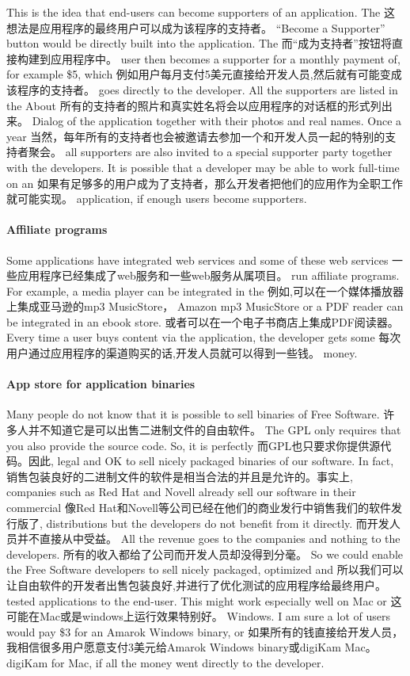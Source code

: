 This is the idea that end-users can become supporters of an application. The
这想法是应用程序的最终用户可以成为该程序的支持者。
``Become a Supporter'' button would be directly built into the application. The
而“成为支持者”按钮将直接构建到应用程序中。
user then becomes a supporter for a monthly payment of, for example \$5, which
例如用户每月支付5美元直接给开发人员,然后就有可能变成该程序的支持者。
goes directly to the developer. All the supporters are listed in the About
所有的支持者的照片和真实姓名将会以应用程序的对话框的形式列出来。
Dialog of the application together with their photos and real names. Once a year
当然，每年所有的支持者也会被邀请去参加一个和开发人员一起的特别的支持者聚会。
all supporters are also invited to a special supporter party together with the
developers. It is possible that a developer may be able to work full-time on an
如果有足够多的用户成为了支持者，那么开发者把他们的应用作为全职工作就可能实现。
application, if enough users become supporters.

\paragraph*{Affiliate programs}

Some applications have integrated web services and some of these web services
一些应用程序已经集成了web服务和一些web服务从属项目。
run affiliate programs. For example, a media player can be integrated in the
例如,可以在一个媒体播放器上集成亚马逊的mp3 MusicStore，
Amazon mp3 MusicStore or a PDF reader can be integrated in an ebook store.
或者可以在一个电子书商店上集成PDF阅读器。
Every time a user buys content via the application, the developer gets some
每次用户通过应用程序的渠道购买的话,开发人员就可以得到一些钱。
money.

\paragraph*{App store for application binaries}

Many people do not know that it is possible to sell binaries of Free Software.
许多人并不知道它是可以出售二进制文件的自由软件。
The GPL only requires that you also provide the source code. So, it is perfectly
而GPL也只要求你提供源代码。因此,
legal and OK to sell nicely packaged binaries of our software. In fact,
销售包装良好的二进制文件的软件是相当合法的并且是允许的。事实上,
companies such as Red Hat and Novell already sell our software in their commercial 
像Red Hat和Novell等公司已经在他们的商业发行中销售我们的软件发行版了,
distributions but the developers do not benefit from it directly. 
而开发人员并不直接从中受益。
All the revenue goes to the companies and nothing to the developers. 
所有的收入都给了公司而开发人员却没得到分毫。
So we could enable the Free Software developers to sell nicely packaged, optimized and
所以我们可以让自由软件的开发者出售包装良好,并进行了优化测试的应用程序给最终用户。
tested applications to the end-user. This might work especially well on Mac or
这可能在Mac或是windows上运行效果特别好。
Windows. I am sure a lot of users would pay \$3 for an Amarok Windows binary, or
如果所有的钱直接给开发人员，我相信很多用户愿意支付3美元给Amarok Windows binary或digiKam Mac。
digiKam for Mac, if all the money went directly to the developer.

